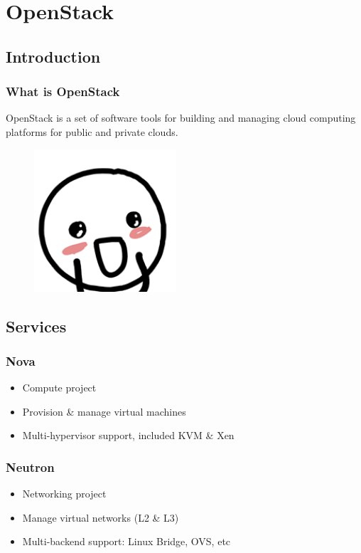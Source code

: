\section{OpenStack} 

\subsection{Introduction} 
\begin{frame}
	\frametitle{What is OpenStack}
	OpenStack is a set of software tools for building and managing cloud computing platforms for public and private clouds.
	\begin{figure}
		\includegraphics[width=0.5\linewidth]{images/happy.png}
	\end{figure}
\end{frame}

\subsection{Services}
\begin{frame}
	\frametitle{Nova}
	\begin{itemize}
		\item Compute project
		\item Provision \& manage virtual machines
		\item Multi-hypervisor support, included KVM \& Xen
	\end{itemize}
\end{frame}

\begin{frame}
	\frametitle{Neutron}
	\begin{itemize}
		\item Networking project
		\item Manage virtual networks (L2 \& L3)
		\item Multi-backend support: Linux Bridge, OVS, etc
	\end{itemize}
\end{frame}

